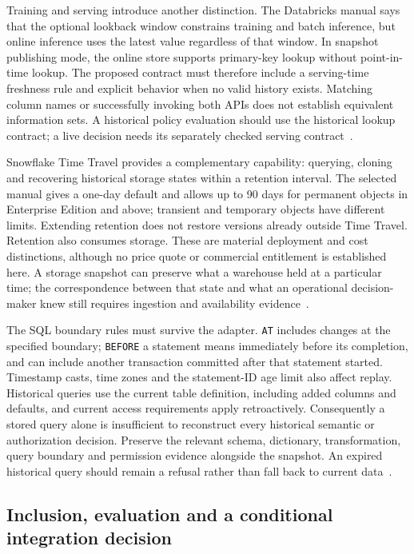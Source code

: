 Training and serving introduce another distinction. The Databricks manual says
that the optional lookback window constrains training and batch inference, but
online inference uses the latest value regardless of that window. In snapshot
publishing mode, the online store supports primary-key lookup without
point-in-time lookup. The proposed contract must therefore include a serving-time
freshness rule and explicit behavior when no valid history exists. Matching column
names or successfully invoking both APIs does not establish equivalent information
sets. A historical policy evaluation should use the historical lookup contract;
a live decision needs its separately checked serving contract~\citep{exec22_obs_databricks_pit}.

Snowflake Time Travel provides a complementary capability: querying, cloning and
recovering historical storage states within a retention interval. The selected
manual gives a one-day default and allows up to 90 days for permanent objects in
Enterprise Edition and above; transient and temporary objects have different
limits. Extending retention does not restore versions already outside Time Travel.
Retention also consumes storage. These are material deployment and cost
distinctions, although no price quote or commercial entitlement is established
here. A storage snapshot can preserve what a warehouse held at a particular time;
the correspondence between that state and what an operational decision-maker knew
still requires ingestion and availability evidence~\citep{exec22_obs_snowflake_time}.

The SQL boundary rules must survive the adapter. \texttt{AT} includes changes at
the specified boundary; \texttt{BEFORE} a statement means immediately before its
completion, and can include another transaction committed after that statement
started. Timestamp casts, time zones and the statement-ID age limit also affect
replay. Historical queries use the current table definition, including added
columns and defaults, and current access requirements apply retroactively.
Consequently a stored query alone is insufficient to reconstruct every historical
semantic or authorization decision. Preserve the relevant schema, dictionary,
transformation, query boundary and permission evidence alongside the snapshot.
An expired historical query should remain a refusal rather than fall back to
current data~\citep{exec22_obs_snowflake_at}.

\subsection{Inclusion, evaluation and a conditional integration decision}
\label{exec22:obs-selection}

